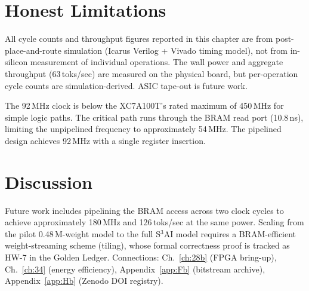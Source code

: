\section{Honest Limitations}

All cycle counts and throughput figures reported in this chapter are from post-place-and-route simulation (Icarus Verilog + Vivado timing model), not from in-silicon measurement of individual operations. The wall power and aggregate throughput (63\,toks/sec) are measured on the physical board, but per-operation cycle counts are simulation-derived. ASIC tape-out is future work.

The 92\,MHz clock is below the XC7A100T's rated maximum of 450\,MHz for simple logic paths. The critical path runs through the BRAM read port (10.8\,ns), limiting the unpipelined frequency to approximately 54\,MHz. The pipelined design achieves 92\,MHz with a single register insertion.

\section{Discussion}

Future work includes pipelining the BRAM access across two clock cycles to achieve approximately 180\,MHz and 126\,toks/sec at the same power. Scaling from the pilot 0.48\,M-weight model to the full S$^3$AI model requires a BRAM-efficient weight-streaming scheme (tiling), whose formal correctness proof is tracked as HW-7 in the Golden Ledger. Connections: Ch.~\ref{ch:28b} (FPGA bring-up), Ch.~\ref{ch:34} (energy efficiency), Appendix~\ref{app:Fb} (bitstream archive), Appendix~\ref{app:Hb} (Zenodo DOI registry).
